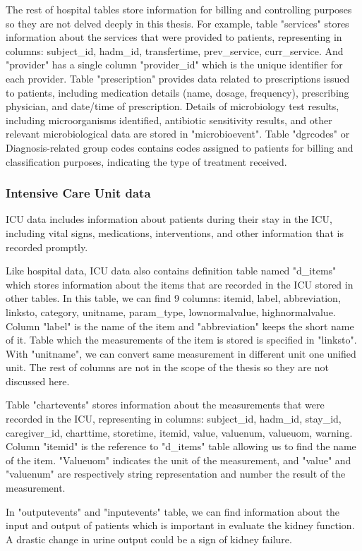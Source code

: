 \documentclass[../main.tex]{subfiles}
\begin{document}
The rest of hospital tables store information for billing and controlling purposes so they are not delved deeply in this thesis.
For example, table "services" stores information about the services that were provided to patients, representing in columns: subject\_id, hadm\_id, transfertime, prev\_service, curr\_service. 
And "provider" has a single column "provider\_id" which is the unique identifier for each provider.
Table "prescription" provides data related to prescriptions issued to patients, including medication details (name, dosage, frequency), prescribing physician, and date/time of prescription.
Details of microbiology test results, including microorganisms identified, antibiotic sensitivity results, and other relevant microbiological data are stored in "microbioevent".
Table "dgrcodes" or Diagnosis-related group codes contains codes assigned to patients for billing and classification purposes, indicating the type of treatment received.


\subsubsection{Intensive Care Unit data}

ICU data includes information about patients during their stay in the ICU, including vital signs, medications, interventions, and other information that is recorded promptly.

Like hospital data, ICU data also contains definition table named "d\_items" which stores information about the items that are recorded in the ICU stored in other tables. 
In this table, we can find 9 columns: itemid, label, abbreviation, linksto, category, unitname, param\_type, lownormalvalue, highnormalvalue.
Column "label" is the name of the item and "abbreviation" keeps the short name of it.
Table which the measurements of the item is stored is specified in "linksto".
With "unitname", we can convert same measurement in different unit one unified unit.
The rest of columns are not in the scope of the thesis so they are not discussed here.

Table "chartevents" stores information about the measurements that were recorded in the ICU, representing in columns: subject\_id, hadm\_id, stay\_id, caregiver\_id, charttime, storetime, itemid, value, valuenum, valueuom, warning.
Column "itemid" is the reference to "d\_items" table allowing us to find the name of the item.
"Valueuom" indicates the unit of the measurement, and "value" and "valuenum" are respectively string representation and number the result of the measurement.

In "outputevents" and "inputevents" table, we can find information about the input and output of patients which is important in evaluate the kidney function.
A drastic change in urine output could be a sign of kidney failure.


\end{document}
